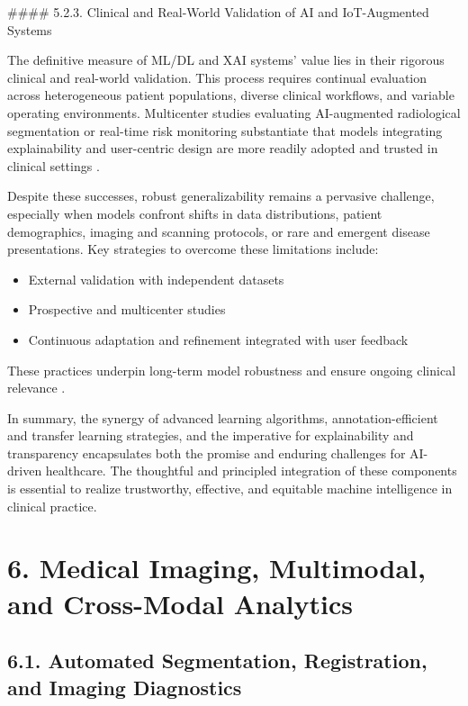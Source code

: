 \documentclass[11pt]{article}
\begin{document}
#### 5.2.3. Clinical and Real-World Validation of AI and IoT-Augmented Systems

The definitive measure of ML/DL and XAI systems’ value lies in their rigorous clinical and real-world validation. This process requires continual evaluation across heterogeneous patient populations, diverse clinical workflows, and variable operating environments. Multicenter studies evaluating AI-augmented radiological segmentation or real-time risk monitoring substantiate that models integrating explainability and user-centric design are more readily adopted and trusted in clinical settings \cite{ref77,ref80,ref84,ref98,ref99,ref107}.

Despite these successes, robust generalizability remains a pervasive challenge, especially when models confront shifts in data distributions, patient demographics, imaging and scanning protocols, or rare and emergent disease presentations. Key strategies to overcome these limitations include:
\begin{itemize}
    \item External validation with independent datasets
    \item Prospective and multicenter studies
    \item Continuous adaptation and refinement integrated with user feedback
\end{itemize}
These practices underpin long-term model robustness and ensure ongoing clinical relevance \cite{ref77,ref99,ref107}.

In summary, the synergy of advanced learning algorithms, annotation-efficient and transfer learning strategies, and the imperative for explainability and transparency encapsulates both the promise and enduring challenges for AI-driven healthcare. The thoughtful and principled integration of these components is essential to realize trustworthy, effective, and equitable machine intelligence in clinical practice.

\section{6. Medical Imaging, Multimodal, and Cross-Modal Analytics}

\subsection{6.1. Automated Segmentation, Registration, and Imaging Diagnostics}
\end{document}

